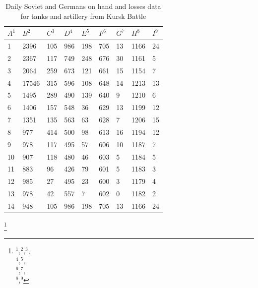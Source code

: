 \documentclass[]{article}
\begin{document}
\begin{table}
 

\tiny
\caption{Daily Soviet and Germans on hand and losses data for tanks and artillery from Kursk Battle}
\tiny

{\begin{tabular}{|p{.1cm}|p{.5cm}|p{.3cm}|p{.3cm}|p{.3cm}|p{.3cm}|p{.2cm}|p{.4cm}|p{.2cm}|} 
\hline
\centering

$A^1$ & $B^2$ & $C^3$	& $D^4$	& $E^5$ & $F^6$	& $G^7$ & $H^8$	& $I^9$ \\
\hline
1&2396&105&986&198&705&13&1166&24\\
\hline
2&2367&117&749&248&676&30&1161&5\\
\hline
3&2064&259&673&121&661&15&1154&7\\
\hline
4&17546&315&596&108&648&14&1213&13\\
\hline
5&1495&289&490&139&640&9&1210&6\\
\hline
6&1406&157&548&36&629&13&1199&12\\
\hline
7&1351&135&563&63&628&7&1206&15\\
\hline
8&977&414&500&98&613&16&1194&12\\
\hline
9&978&117&495&57&606&10&1187&7\\
\hline
10&907&118&480&46&603&5&1184&5\\
\hline
11&883&96&426&79&601&5&1183&3\\
\hline
12&985&27&495&23&600&3&1179&4\\
\hline
13&978&42&557&7&602&0&1182&2\\
\hline
14&948&105&986&198&705&13&1166&24\\
\hline
\end{tabular}}%
\tiny
{\footnote{$^1$,$^2$,$^3$,\\$^4$,$^5$,\\$^6$,$^7$,\\$^8$,$^9$}}\\
\end{table}
\end{document}
